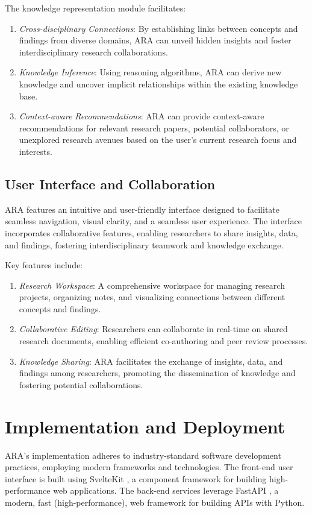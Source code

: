 \documentclass[a4paper,conference]{IEEEtran}
\begin{document}
The knowledge representation module facilitates:
\begin{enumerate}
\item \textit{Cross-disciplinary Connections}: By establishing links between concepts and findings from diverse domains, ARA can unveil hidden insights and foster interdisciplinary research collaborations.
\item \textit{Knowledge Inference}: Using reasoning algorithms, ARA can derive new knowledge and uncover implicit relationships within the existing knowledge base.
\item \textit{Context-aware Recommendations}: ARA can provide context-aware recommendations for relevant research papers, potential collaborators, or unexplored research avenues based on the user's current research focus and interests.
\end{enumerate}

\subsection{User Interface and Collaboration}
ARA features an intuitive and user-friendly interface designed to facilitate seamless navigation, visual clarity, and a seamless user experience. The interface incorporates collaborative features, enabling researchers to share insights, data, and findings, fostering interdisciplinary teamwork and knowledge exchange.

Key features include:
\begin{enumerate}
\item \textit{Research Workspace}: A comprehensive workspace for managing research projects, organizing notes, and visualizing connections between different concepts and findings.
\item \textit{Collaborative Editing}: Researchers can collaborate in real-time on shared research documents, enabling efficient co-authoring and peer review processes.
\item \textit{Knowledge Sharing}: ARA facilitates the exchange of insights, data, and findings among researchers, promoting the dissemination of knowledge and fostering potential collaborations.
\end{enumerate}

\section{Implementation and Deployment}
ARA's implementation adheres to industry-standard software development practices, employing modern frameworks and technologies. The front-end user interface is built using SvelteKit \cite{sveltekit}, a component framework for building high-performance web applications. The back-end services leverage FastAPI \cite{fastapi}, a modern, fast (high-performance), web framework for building APIs with Python.
\end{document}
